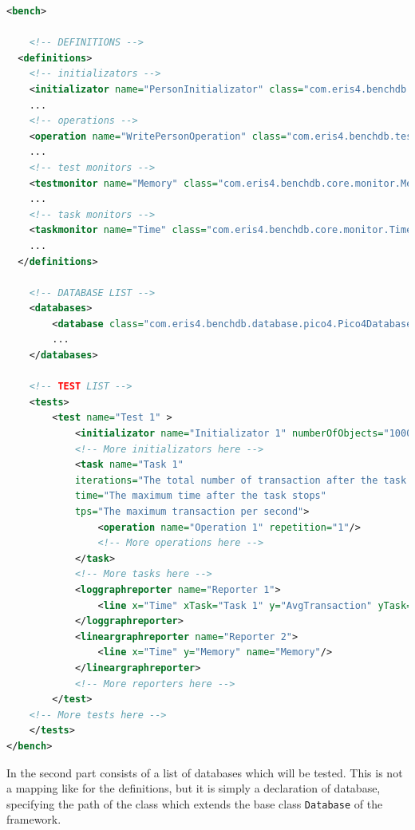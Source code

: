 \begin{lstlisting}[language=xml,caption={Training bench-properties.xml},label={bench-properties-training}]
<bench>
	
	<!-- DEFINITIONS -->
  <definitions>
  	<!-- initializators -->
  	<initializator name="PersonInitializator" class="com.eris4.benchdb.test.person.initializator.PersonInitializator"/>
  	...    	
  	<!-- operations -->
  	<operation name="WritePersonOperation" class="com.eris4.benchdb.test.person.operation.WritePersonOperation"/>
  	...
  	<!-- test monitors -->
  	<testmonitor name="Memory" class="com.eris4.benchdb.core.monitor.MemoryMonitor"/>
  	...
  	<!-- task monitors -->
  	<taskmonitor name="Time" class="com.eris4.benchdb.core.monitor.TimeMonitor"/>
  	...    	
  </definitions>
	
	<!-- DATABASE LIST -->
	<databases>
		<database class="com.eris4.benchdb.database.pico4.Pico4Database"/>
		...
	</databases>
		
	<!-- TEST LIST -->
	<tests>
		<test name="Test 1" >
			<initializator name="Initializator 1" numberOfObjects="1000"/>
			<!-- More initializators here -->						
			<task name="Task 1" 
			iterations="The total number of transaction after the task stops" 
			time="The maximum time after the task stops" 
			tps="The maximum transaction per second">	
				<operation name="Operation 1" repetition="1"/>
				<!-- More operations here -->			
			</task>
			<!-- More tasks here -->
			<loggraphreporter name="Reporter 1">
				<line x="Time" xTask="Task 1" y="AvgTransaction" yTask="Task 1" name="AVG"/>
			</loggraphreporter>
			<lineargraphreporter name="Reporter 2">
				<line x="Time" y="Memory" name="Memory"/>		
			</lineargraphreporter>
			<!-- More reporters here -->
		</test>
	<!-- More tests here -->
	</tests>
</bench>
\end{lstlisting}

In the second part consists of a list of databases which will be tested. This is not a mapping like for the definitions, but it is simply a declaration of database, specifying the path of the class which extends the base class \lstinline!Database! of the framework.

